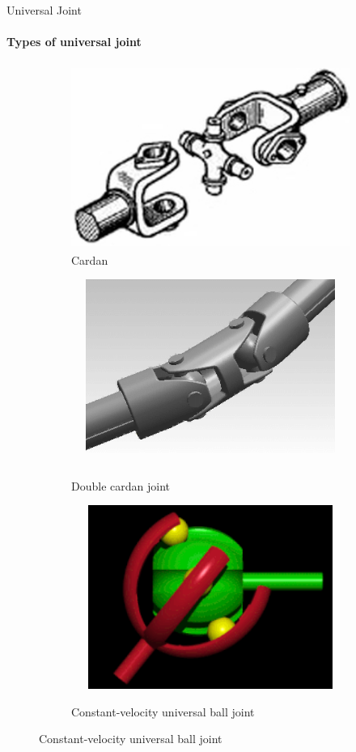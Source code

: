 \documentclass[aspectratio=169]{beamer}
\begin{document}
\begin{frame}[t]{Universal Joint}
    \framesubtitle{Types of universal joint}
    \begin{figure}[H]
        \begin{subfigure}{0.32\textwidth}
            \centering\includegraphics[height=6cm,width=1\textwidth,keepaspectratio]{universal_1.png}
            \caption*{Cardan}
        \end{subfigure}
        \begin{subfigure}{0.32\textwidth}
            \href{https://en.wikipedia.org/wiki/Constant-velocity_joint\#/media/File:Double_Cardan_Joint_(animated).gif}{
                \centering\includegraphics[height=6cm,width=1\textwidth,keepaspectratio]{universal_2_video_preview.png}}
            \caption*{Double cardan joint}
        \end{subfigure}
        \begin{subfigure}{0.32\textwidth}
            \href{https://gifyu.com/image/SqMnR}{
                \centering\includegraphics[height=6cm,width=1\textwidth,keepaspectratio]{shrus_video_preview.png}}
            \caption*{Constant-velocity universal ball joint}
        \end{subfigure}
    \end{figure}
\end{frame}
\end{document}
